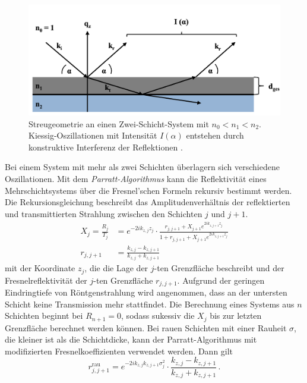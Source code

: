 \begin{figure}
    \centering
    \includegraphics[width = \linewidth]{schichtdicke.png}
    \caption{Streugeometrie an einen Zwei-Schicht-System mit $n_0 < n_1 < n_2$. Kiessig-Oszillationen 
    mit Intensität $I(\alpha)$ entstehen durch konstruktive Interferenz der Reflektionen \cite{dissertation}.}
    \label{fig:schichtdicke}
\end{figure}
Bei einem System mit mehr als zwei Schichten überlagern sich verschiedene Oszillationen. Mit dem \textit{Parratt-Algorithmus}
kann die Reflektivität eines Mehrschichtsystems über die Fresnel'schen Formeln rekursiv bestimmt werden.
Die Rekursionsgleichung beschreibt das Amplitudenverhältnis der reflektierten und transmittierten Strahlung
zwischen den Schichten $j$ und $j+1$. 
\begin{align}
    X_j = \frac{R_j}{T_j} &= e^{-2 i k_{z,j}z_j} \cdot \frac{r_{j, j+1} + X_{j+1}e^{2 i k_{z,j+1}z_j}}{1+r_{j, j+1} + X_{j+1}e^{2 i k_{z,j+1}z_j}} \\
    r_{j, j+1} &= \frac{k_{z,j}-k_{z, j+1}}{k_{z,j}+k_{z, j+1}}
\end{align}
mit der Koordinate $z_j$, die die Lage der $j$-ten Grenzfläche beschreibt und der Fresnelreflektivität
der $j$-ten Grenzfläche $r_{j, j+1}$.
Aufgrund der geringen Eindringtiefe von Röntgenstrahlung wird angenommen, dass an der untersten Schicht 
keine Transmission mehr stattfindet.
Die Berechnung eines Systems aus $n$ Schichten beginnt bei $R_{n+1} = 0$, sodass sukessiv die $X_j$ bis zur 
letzten Grenzfläche berechnet werden können. 
Bei rauen Schichten mit einer Rauheit $\sigma$, die kleiner ist als die Schichtdicke, kann der Parratt-Algorithmus
mit modifizierten Fresnelkoeffizienten verwendet werden. Dann gilt \cite{dissertation}
\begin{equation}
    r_{j, j+1}^\text{rau} = e^{-2 i k_{z,j} k_{z, j+1} \sigma_j^2} \cdot \frac{k_{z,j}-k_{z, j+1}}{k_{z,j}+k_{z, j+1}} \, .
\end{equation}

